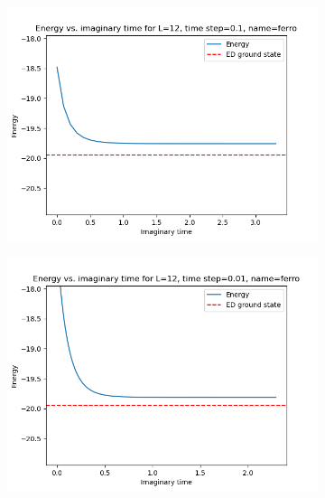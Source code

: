 \documentclass[12pt]{article}
\begin{document}
\begin{figure}
\begin{subfigure}{.5\textwidth}
  \centering
  \includegraphics[width=\linewidth]{p4_1_energy_L_12_time_step_0.1_name_ferro.png}
\end{subfigure}
\begin{subfigure}{.5\textwidth}

    \centering
    \includegraphics[width=\linewidth]{p4_1_energy_L_12_time_step_0.01_name_ferro.png}
\end{subfigure}
\end{figure}
\end{document}
